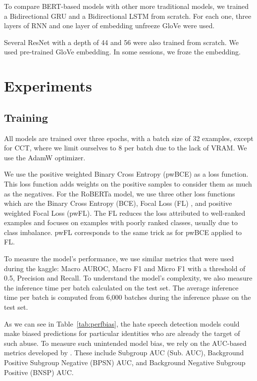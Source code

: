 \documentclass[a4paper,english]{rnti}
\makeatletter
\newcommand\foottotoref[1]{\protected@xdef\@thefnmark{\ref{#1}}\@footnotemark}
\makeatother
\begin{document}
To compare BERT-based models with other more traditional models, we trained a Bidirectional GRU and a Bidirectional LSTM from scratch. For each one, three layers of RNN and one layer of embedding unfreeze GloVe \citep{pennington-etal-2014-glove} were used.

Several ResNet \citep{45} with a depth of 44 and 56 were also trained from scratch. We used pre-trained GloVe embedding. In some sessions, we froze the embedding.





\section{Experiments}
\label{sec:experiments}

\subsection{Training}

All models are trained over three epochs, with a batch size of 32 examples, except for CCT, where we limit ourselves to 8 per batch due to the lack of VRAM. We use the AdamW optimizer.


We use the positive weighted Binary Cross Entropy (pwBCE) as a loss function. This loss function adds weights on the positive samples to consider them as much as the negatives. For the RoBERTa model, we use three other loss functions which are the Binary Cross Entropy (BCE), Focal Loss (FL) \citep{46}, and positive weighted Focal Loss (pwFL). The FL reduces the loss attributed to well-ranked examples and focuses on examples with poorly ranked classes, usually due to class imbalance. pwFL corresponds to the same trick as for pwBCE applied to FL.

To measure the model's performance, we use similar metrics that were used during the kaggle\foottotoref{civil-comments-data}: Macro AUROC, Macro F1 and Micro F1 with a threshold of 0.5, Precision and Recall.
To understand the model's complexity, we also measure the inference time per batch calculated on the test set. The average inference time per batch is computed from 6,000 batches during the inference phase on the test set.

As we can see in Table~\ref{tab:perfbias}, the hate speech detection models could make biased predictions for particular identities who are already the target of such abuse. To measure such unintended model
bias, we rely on the AUC-based metrics developed by \citet{23}. These include Subgroup AUC (Sub. AUC), Background Positive Subgroup Negative (BPSN) AUC, and Background Negative Subgroup Positive (BNSP) AUC. 
\end{document}
